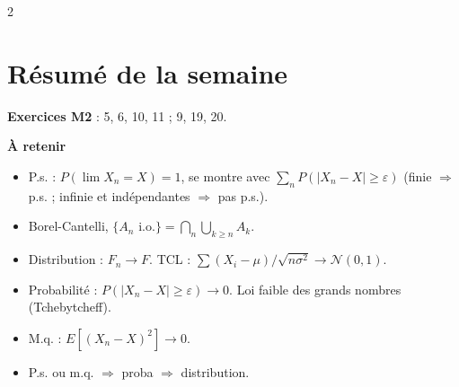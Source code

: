 \documentclass[a4paper,9pt]{extarticle}
\begin{document}
\begin{multicols}{2}
\begin{simple}
\end{simple}


\section{Résumé de la semaine}


\begin{summary}

\textbf{Exercices M2} : 5, 6, 10, 11 ; 9, 19, 20.

\vspace{3pt}

\textbf{À retenir}

\begin{itemize}

\item P.s. : $P(\lim X_n = X) = 1$, se montre avec $\sum_n P(|X_n - X|\ge\varepsilon)$ (finie
$\Rightarrow$ p.s. ; infinie et indépendantes $\Rightarrow$ pas p.s.).

\item Borel-Cantelli, $\{A_n\text{ i.o.}\} = \bigcap_n\bigcup_{k\ge n}A_k$.

\item Distribution : $F_n \to F$. TCL : $\sum(X_i - \mu)/\sqrt{n\sigma^2} \to \mathcal N(0,1)$.

\item Probabilité : $P(|X_n - X|\ge\varepsilon)\to0$. Loi faible des grands nombres
(Tchebytcheff).

\item M.q. : $E[(X_n-X)^2] \to 0$.

\item P.s. ou m.q. $\Rightarrow$ proba $\Rightarrow$ distribution.

\end{itemize}

\end{summary}

\end{multicols}
\end{document}
